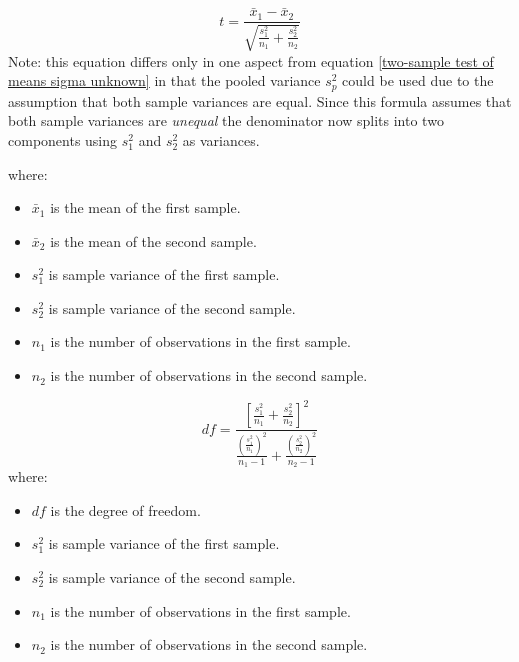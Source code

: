 \begin{equation}
\label{test statistic for no difference in means unequal variances}
t = \frac{\bar{x}_{1} - \bar{x}_{2}}{\sqrt{\frac{s^{2}_{1}}{n_{1}}+\frac{s^{2}_{2}}{n_{2}}}}
\end{equation}
Note: this equation differs only in one aspect from equation \eqref{two-sample test of means sigma unknown} in that the pooled variance $s^{2}_{p}$ could be used due to the assumption that both sample variances are equal. Since this formula assumes that both sample variances are \textit{unequal} the denominator now splits into two components using $s^{2}_1{}$ and $s^{2}_{2}$ as variances.

where:
\begin{itemize}
 \item $\bar{x}_{1}$ is the mean of the first sample.
 \item $\bar{x}_{2}$ is the mean of the second sample.
 \item $s^{2}_{1}$ is sample variance of the first sample.
 \item $s^{2}_{2}$ is sample variance of the second sample.
 \item $n_{1}$ is the number of observations in the first sample. 
 \item $n_{2}$ is the number of observations in the second sample.
\end{itemize}
\hformbar


\begin{equation}
\label{degrees of freedom for unequal variance test}
df = \frac{\left[\frac{s^{2}_{1}}{n_{1}} + \frac{s^{2}_{2}}{n_{2}} \right]^{2}}{\frac{(\frac{s^{2}_{1}}{n_{1}})^{2}}{n_{1}-1} + \frac{(\frac{s^{2}_{2}}{n_{2}})^{2}}{n_{2}-1}}
\end{equation}
where:
\begin{itemize}
 \item $df$ is the degree of freedom.
 \item $s^{2}_{1}$ is sample variance of the first sample.
 \item $s^{2}_{2}$ is sample variance of the second sample.
 \item $n_{1}$ is the number of observations in the first sample. 
 \item $n_{2}$ is the number of observations in the second sample.
\end{itemize}
\hformbar


